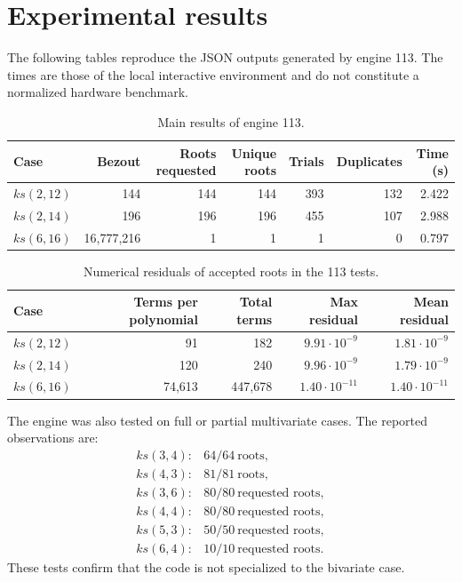 \documentclass[11pt,a4paper]{article}
\begin{document}
\section{Experimental results}
The following tables reproduce the JSON outputs generated by engine 113. The times are those of the local interactive environment and do not constitute a normalized hardware benchmark.

\begin{table}[h]
\centering
\begin{tabular}{lrrrrrr}
\toprule
Case & Bezout & Roots requested & Unique roots & Trials & Duplicates & Time (s)\\
\midrule
\(ks(2,12)\) & 144 & 144 & 144 & 393 & 132 & 2.422\\
\(ks(2,14)\) & 196 & 196 & 196 & 455 & 107 & 2.988\\
\(ks(6,16)\) & 16,777,216 & 1 & 1 & 1 & 0 & 0.797\\
\bottomrule
\end{tabular}
\caption{Main results of engine 113.}
\label{tab:113-main}
\end{table}

\begin{table}[h]
\centering
\begin{tabular}{lrrrr}
\toprule
Case & Terms per polynomial & Total terms & Max residual & Mean residual\\
\midrule
\(ks(2,12)\) & 91 & 182 & \(9.91\cdot 10^{-9}\) & \(1.81\cdot 10^{-9}\)\\
\(ks(2,14)\) & 120 & 240 & \(9.96\cdot 10^{-9}\) & \(1.79\cdot 10^{-9}\)\\
\(ks(6,16)\) & 74,613 & 447,678 & \(1.40\cdot 10^{-11}\) & \(1.40\cdot 10^{-11}\)\\
\bottomrule
\end{tabular}
\caption{Numerical residuals of accepted roots in the 113 tests.}
\label{tab:113-res}
\end{table}

The engine was also tested on full or partial multivariate cases. The reported observations are:
\[
\begin{array}{ll}
ks(3,4): & 64/64\ \text{roots},\\
ks(4,3): & 81/81\ \text{roots},\\
ks(3,6): & 80/80\ \text{requested roots},\\
ks(4,4): & 80/80\ \text{requested roots},\\
ks(5,3): & 50/50\ \text{requested roots},\\
ks(6,4): & 10/10\ \text{requested roots}.
\end{array}
\]
These tests confirm that the code is not specialized to the bivariate case.
\end{document}
